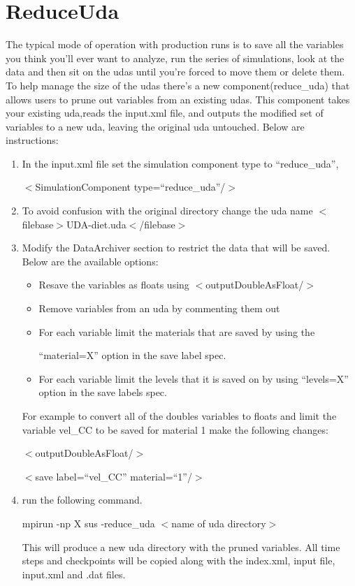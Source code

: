 \section{ReduceUda}
The typical mode of operation with production runs is to save all the variables you think you'll ever want to analyze, run the series of simulations, look at the data and then sit on the udas until you're forced to move them or delete them.  To help manage the size of the udas there's a new component(reduce\_uda) that allows users to prune out variables from an existing udas.   This component takes your existing uda,reads the input.xml file, and outputs the modified set of variables to a new uda, leaving the original uda untouched.
Below are instructions:
\begin{enumerate}
\item In the input.xml file set the simulation component type to ``reduce\_uda'', 

$<$SimulationComponent type=``reduce\_uda''/$>$
\item To avoid confusion with the original directory  change the uda name
   $<$filebase$>$UDA-diet.uda$<$/filebase$>$

\item Modify the DataArchiver section to restrict the data that will be saved.  Below are the available options:
   \begin{itemize}
     \item Resave the variables as floats using $<$outputDoubleAsFloat/$>$
     \item Remove variables from an uda by commenting them out
     \item For each variable limit the materials that are saved by using the 
    
     ``material=X'' option in the save label spec.
     \item For each variable limit the levels that it is saved on by using ``levels=X'' option in the save labels spec.
  \end{itemize}
For example to convert all of the doubles variables to floats and limit the variable vel\_CC to be
saved for material 1 make the following changes:

$<$outputDoubleAsFloat/$>$

$<$save label=``vel\_CC'' material=``1''/$>$


\item run the following command.

    mpirun -np X sus -reduce\_uda $<$name of uda directory$>$
    
    This will produce a new uda directory with the pruned variables. All time steps and checkpoints will be copied along with the index.xml, input file, input.xml and .dat files.

\end{enumerate}

